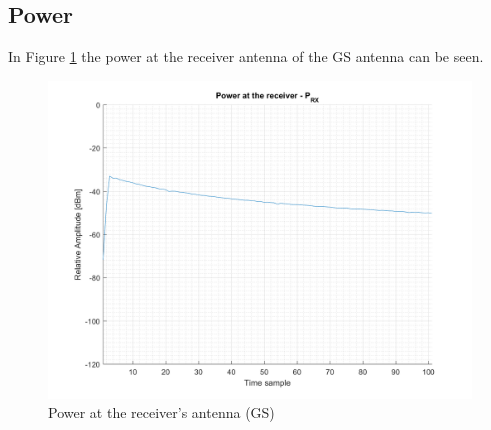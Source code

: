 \subsection{Power}
In Figure \ref{fig:s2_power} the power at the receiver antenna of the GS antenna can be seen.

\begin{figure}[H]
\centering
\includegraphics[scale=0.75]{figures/scenario_2_power.png}
\caption{Power at the receiver's antenna (GS)}
\label{fig:s2_power}
\end{figure}

